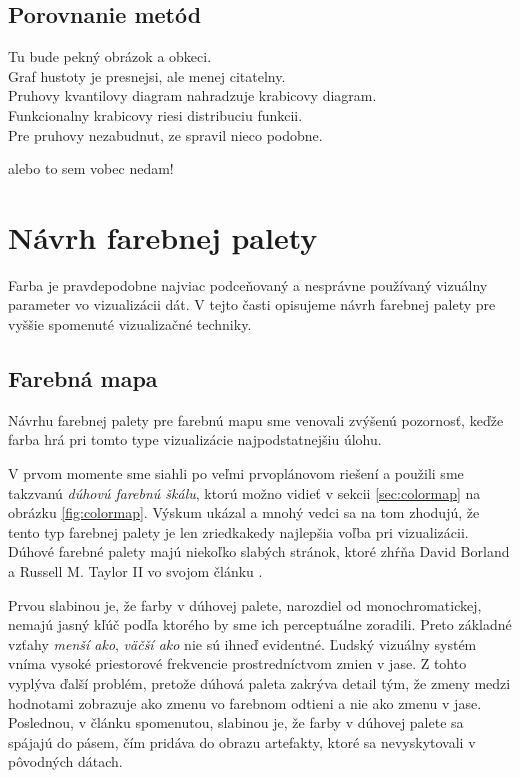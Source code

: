 \subsection{Porovnanie metód}

Tu bude pekný obrázok a obkeci. \\
Graf hustoty je presnejsi, ale menej citatelny. \\
Pruhovy kvantilovy diagram nahradzuje krabicovy diagram. \\
Funkcionalny krabicovy riesi distribuciu funkcii. \\

Pre pruhovy nezabudnut, ze \cite{Bade} spravil nieco podobne.

alebo to sem vobec nedam! 

\section{Návrh farebnej palety}
Farba je pravdepodobne najviac podceňovaný a nesprávne používaný vizuálny parameter vo vizualizácii dát. V tejto časti opisujeme návrh farebnej palety pre vyššie spomenuté vizualizačné techniky.

\subsection{Farebná mapa}
Návrhu farebnej palety pre farebnú mapu sme venovali zvýšenú pozornosť, keďže farba hrá pri tomto type vizualizácie najpodstatnejšiu úlohu.

V prvom momente sme siahli po veľmi prvoplánovom riešení a použili sme takzvanú \textit{dúhovú farebnú škálu}, ktorú možno vidieť v sekcii \ref{sec:colormap} na obrázku \ref{fig:colormap}. Výskum ukázal a mnohý vedci sa na tom zhodujú, že tento typ farebnej palety je len zriedkakedy najlepšia voľba pri vizualizácii. Dúhové farebné palety majú niekoľko slabých stránok, ktoré zhŕňa David Borland a Russell M. Taylor II vo svojom článku \cite{RainbowHarmful}.

Prvou slabinou je, že farby v dúhovej palete, narozdiel od monochromatickej, nemajú jasný kľúč podľa ktorého by sme ich perceptuálne zoradili. Preto základné vzťahy \textit{menší ako}, \textit{väčší ako} nie sú ihneď evidentné. Ľudský vizuálny systém vníma vysoké priestorové frekvencie prostredníctvom zmien v jase. Z tohto vyplýva ďalší problém, pretože dúhová paleta zakrýva detail tým, že zmeny medzi hodnotami zobrazuje ako zmenu vo farebnom odtieni a nie ako zmenu v jase. Poslednou, v článku spomenutou, slabinou je, že farby v dúhovej palete sa spájajú do pásem, čím pridáva do obrazu artefakty, ktoré sa nevyskytovali v pôvodných dátach. 

